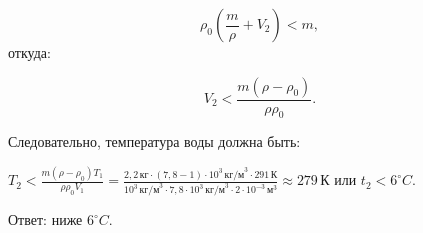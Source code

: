 \documentclass[12pt,a4paper]{article}
\begin{document}
{\[\rho _0 ( \frac{m}{\rho} + V_2 ) < m,\]
 откуда:

\[V_2 < \frac{m ( \rho - \rho _0 )}{\rho\rho _0} .\]

Следовательно, температура воды должна быть:

$T_2 < \frac{m ( \rho - \rho _0 ) T_1}{\rho \rho _0V_1} = \frac{2{,}2\,\text{кг} \cdot ( 7{,}8 - 1 ) \cdot 10 ^3 \,\text{кг/м} ^3 \cdot 291\,\text{К}}{10 ^3 \,\text{кг/м} ^3 \cdot 7{,}8 \cdot 10 ^3 \,\text{кг/м} ^3 \cdot 2 \cdot 10 ^{ - 3 } \,\text{м} ^3} \approx 279\,\text{К}$ или $t_2 < 6 ^\circ C.$

Ответ: ниже $6 ^\circ C.$
}
\end{document}
